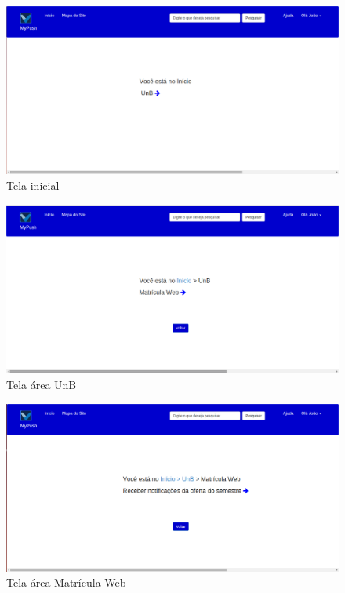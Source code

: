 \label{telas_desktop}
  \begin{figure}[h!]
  \centering
    \includegraphics[keepaspectratio=true, scale=0.35]{figuras/tela1.png}
  \caption{Tela inicial}
\end{figure}

  \begin{figure}[h!]
  \centering
    \includegraphics[keepaspectratio=true, scale=0.35]{figuras/tela2.png}
  \caption{Tela área UnB}
\end{figure}

  \begin{figure}[h!]
  \centering
    \includegraphics[keepaspectratio=true, scale=0.35]{figuras/tela3.png}
  \caption{Tela área Matrícula Web}
\end{figure}

